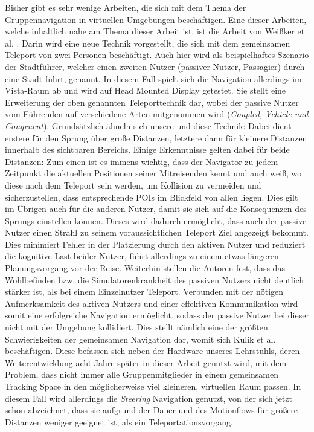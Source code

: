 Bisher gibt es sehr wenige Arbeiten, die sich mit dem Thema der Gruppennavigation in virtuellen Umgebungen beschäftigen. Eine dieser Arbeiten, welche inhaltlich nahe am Thema dieser Arbeit ist, ist die Arbeit von Weißker et al. \cite{WeisskerMulti-RayReality}. Darin wird eine neue Technik vorgestellt, die sich mit dem gemeinsamen Teleport von zwei Personen beschäftigt. Auch hier wird als beispielhaftes Szenario der Stadtführer, welcher einen zweiten Nutzer (passiver Nutzer, Passagier) durch eine Stadt führt, genannt. 
In diesem Fall spielt sich die Navigation allerdings im Vista-Raum ab und wird auf Head Mounted Display getestet. Sie stellt eine Erweiterung der oben genannten Teleporttechnik dar, wobei der passive Nutzer vom Führenden auf verschiedene Arten mitgenommen wird (\textit{Coupled, Vehicle und Congruent}). Grundsätzlich ähneln sich unsere und diese Technik: Dabei dient erstere für den Sprung über große Distanzen, letztere dann für kleinere Distanzen innerhalb des sichtbaren Bereichs. Einige Erkenntnisse gelten dabei für beide Distanzen: Zum einen ist es immens wichtig, dass der Navigator zu jedem Zeitpunkt die aktuellen Positionen seiner Mitreisenden kennt und auch weiß, wo diese nach dem Teleport sein werden, um Kollision zu vermeiden und sicherzustellen, dass entsprechende POIs im Blickfeld von allen liegen. Dies gilt im Übrigen auch für die anderen Nutzer, damit sie sich auf die Konsequenzen des Sprungs einstellen können. Dieses wird dadurch ermöglicht, dass auch der passive Nutzer einen Strahl zu seinem voraussichtlichen Teleport Ziel angezeigt bekommt. Dies minimiert Fehler in der Platzierung durch den aktiven Nutzer und reduziert die kognitive Last beider Nutzer, führt allerdings zu einem etwas längeren Planungsvorgang vor der Reise. Weiterhin stellen die Autoren fest, dass das Wohlbefinden bzw. die Simulatorenkrankheit des passiven Nutzers nicht deutlich stärker ist, als bei einem Einzelnutzer Teleport. Verbunden mit der nötigen Aufmerksamkeit des aktiven Nutzers und einer effektiven Kommunikation wird somit eine erfolgreiche Navigation ermöglicht, sodass der passive Nutzer bei dieser nicht mit der Umgebung kollidiert. Dies stellt nämlich eine der größten Schwierigkeiten der gemeinsamen Navigation dar, womit sich Kulik et al. \cite{Kulik2011C1x6} beschäftigen. Diese befassen sich neben der Hardware unseres Lehrstuhls, deren Weiterentwicklung acht Jahre später in dieser Arbeit genutzt wird, mit dem Problem, dass nicht immer alle Gruppenmitglieder in einem gemeinsamen Tracking Space in den möglicherweise viel kleineren, virtuellen Raum passen. In diesem Fall wird allerdings die \textit{Steering} Navigation genutzt, von der sich jetzt schon abzeichnet, dass sie aufgrund der Dauer und des Motionflows für größere Distanzen weniger geeignet ist, als ein Teleportationsvorgang.
